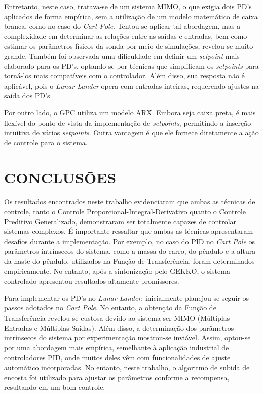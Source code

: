 \documentclass[12pt,           %
a4paper,                       %
openany,                       %
oneside,                       %
chapter=TITLE,                 %
english,                       %
spanish,                       %
brazil,                        %
sumario=tradicional]{abntex2}  %
\begin{document}
\begin{OnehalfSpace}
Entretanto, neste caso, tratava-se de um sistema MIMO, o que exigia dois PD's aplicados de forma empírica, sem a utilização de um modelo matemático de caixa branca, como no caso do \textit{Cart Pole}. Tentou-se aplicar tal abordagem, mas a complexidade em determinar as relações entre as saídas e entradas, bem como estimar os parâmetros físicos da sonda por meio de simulações, revelou-se muito grande. Também foi observada uma dificuldade em definir um \textit{setpoint} mais elaborado para os PD's, optando-se por técnicas que simplificam os \textit{setpoints} para torná-los mais compatíveis com o controlador. Além disso, sua resposta não é aplicável, pois o \textit{Lunar Lander} opera com entradas inteiras, requerendo ajustes na saída dos PD's.

Por outro lado, o GPC utiliza um modelo ARX. Embora seja caixa preta, é mais flexível do ponto de vista da implementação de \textit{setpoints}, permitindo a inserção intuitiva de vários \textit{setpoints}. Outra vantagem é que ele fornece diretamente a ação de controle para o sistema.\\


{\let\clearpage\relax\par \chapter{CONCLUSÕES}}
\label{ch:conclusoes}                       %


Os resultados encontrados neste trabalho evidenciaram que ambas as técnicas de controle, tanto o Controle Proporcional-Integral-Derivativo quanto o Controle Preditivo Generalizado, demonstraram ser totalmente capazes de controlar sistemas complexos. É importante ressaltar que ambas as técnicas apresentaram desafios durante a implementação. Por exemplo, no caso do PID no \textit{Cart Pole} os parâmetros intrínsecos do sistema, como a massa do carro, do pêndulo e a altura da haste do pêndulo, utilizados na Função de Transferência, foram determinados empiricamente. No entanto, após a sintonização pelo GEKKO, o sistema controlado apresentou resultados altamente promissores.

Para implementar os PD's no \textit{Lunar Lander}, inicialmente planejou-se seguir os passos adotados no \textit{Cart Pole}. No entanto, a obtenção da Função de Transferência revelou-se custosa devido ao sistema ser MIMO (Múltiplas Entradas e Múltiplas Saídas). Além disso, a determinação dos parâmetros intrínsecos do sistema por experimentação mostrou-se inviável. Assim, optou-se por uma abordagem mais empírica, semelhante à aplicação industrial de controladores PID, onde muitos deles vêm com funcionalidades de ajuste automático incorporadas. No entanto, neste trabalho, o algoritmo de subida de encosta foi utilizado para ajustar os parâmetros conforme a recompensa, resultando em um bom controle.


\end{OnehalfSpace}
\end{document}
